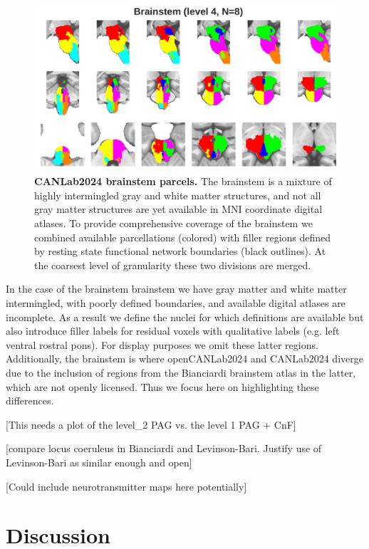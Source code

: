 \documentclass[10pt,letterpaper]{article}
\begin{document}
\begin{figure}[t]
\begin{minipage}{\linewidth}
\end{minipage}
\begin{minipage}{\linewidth}
\includegraphics[width=\linewidth]{images/bstem_coarsest.png}
\end{minipage}
\caption{
{\bf
CANLab2024 brainstem parcels.} The brainstem is a mixture of highly intermingled gray and white matter structures, and not all gray matter structures are yet available in MNI coordinate digital atlases. To provide comprehensive coverage of the brainstem we combined available parcellations (colored) with filler regions defined by resting state functional network boundaries (black outlines). At the coarsest level of granularity these two divisions are merged.
}
\label{brainstem-granularities-figure}
\end{figure}

In the case of the brainstem brainstem we have gray matter and white matter intermingled, with poorly defined boundaries, and available digital atlases are incomplete. As a result we define the nuclei for which definitions are available but also introduce filler labels for residual voxels with qualitative labels (e.g. left ventral rostral pons). For display purposes we omit these latter regions. Additionally, the brainstem is where openCANLab2024 and CANLab2024 diverge due to the inclusion of regions from the Bianciardi brainstem atlas in the latter, which are not openly licensed. Thus we focus here on highlighting these differences.

[This needs a plot of the level\_2 PAG vs. the level 1 PAG + CnF]

[compare locus coeruleus in Bianciardi and Levinson-Bari. Justify use of Levinson-Bari as similar enough and open]

[Could include neurotransmitter maps here potentially]


\section{Discussion}
\end{document}
